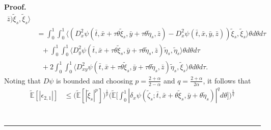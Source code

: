 \documentclass[a4paper,oneside,10pt]{article}%
\newenvironment{proof}[1][Proof]{\noindent \textbf{#1.} }{\  \rule{0.5em}{0.5em}}
\numberwithin{equation}{section}
\begin{document}
\begin{proof}
\begin{align*}
\bar{z})\tilde{\xi}_{s},\tilde{\xi}_{s}\rangle \\
&  =\int_{0}^{1}\int_{0}^{1}\big \langle(D_{x}^{2}\psi(\bar{t},\bar{x}%
+\tau \theta \tilde{\xi}_{s},\bar{y}+\tau \theta \tilde{\eta}_{s},\bar{z}%
)-D_{x}^{2}\psi( \bar{t},\bar{x},\bar{y},\bar{z}))\tilde{\xi}_{s},\tilde{\xi
}_{s}\big \rangle \theta d\theta d\tau \\
&  \text{\  \  \ }+\int_{0}^{1}\int_{0}^{1}\big \langle D_{y}^{2}\psi(\bar
{t},\bar{ x }+\tau \theta \tilde{\xi}_{s},\bar{y}+\tau \theta \tilde{\eta}%
_{s},\bar{z} ) \tilde{\eta}_{s},\tilde{\eta}_{s}\big \rangle \theta d\theta
d\tau \\
&  \text{\  \  \ }+2\int_{0}^{1}\int_{0}^{1}\big \langle D_{xy}^{2}\psi(\bar
{t},\bar{ x}+\tau \theta \tilde{\xi}_{s},\bar{y}+\tau \theta \tilde{\eta}_{s}%
,\bar{z} ) \tilde{\eta}_{s},\tilde{\xi}_{s}\big \rangle \theta d\theta d\tau.
\end{align*}
Noting that $D\psi$ is bounded and choosing $p=\frac{2+\alpha}{2-\alpha}$ and
$q=\frac{2+\alpha}{2\alpha}$, it follows that
\begin{align*}
\mathbb{\tilde{E}}[|\epsilon_{2,1}|]  &  \leq \big(\mathbb{\tilde{E}}[|\tilde{
\xi}_{s}|^{p}]\big)^{\frac{1}{p}}\bigg(\mathbb{\tilde{E}}\bigg[ \int_{0}%
^{1}|\delta_{x}\psi(\tilde{\zeta}_{s};\bar{t},\bar{x}+\theta \tilde{ \xi}%
_{s},\bar{y}+\theta \tilde{\eta}_{s})|^{q}d\theta \bigg]\bigg)^{\frac{1}{q}}\\

\end{align*}
\end{proof}
\end{document}
